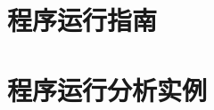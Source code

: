 \documentclass[supercite]{HustGraduPaper}
\begin{document}
	\section{程序运行指南}

	\section{程序运行分析实例}


	\nocite{*}

	
\end{document}
